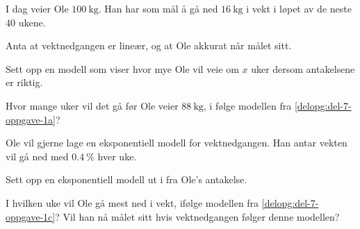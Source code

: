 I dag veier Ole $\SI{100}{\kg}$. Han har som mål å gå ned $\SI{16}{\kg}$ i vekt
i løpet av de neste $40$ ukene. \bigskip

Anta at vektnedgangen er lineær, og at Ole akkurat når målet sitt.

\begin{oppgaver}
   Sett opp en modell som viser hvor mye Ole vil veie om $x$ uker
  dersom antakelsene er riktig.
  \label{delopg:del-7-oppgave-1a}
\end{oppgaver}

\begin{oppgaver}
   Hvor mange uker vil det gå før Ole veier $\SI{88}{\kg}$, i følge
  modellen fra \cref{delopg:del-7-oppgave-1a}?
\end{oppgaver}

Ole vil gjerne lage en eksponentiell modell for vektnedgangen. Han antar vekten
vil gå ned med $\SI{0.4}{\percent}$ hver uke.

\begin{oppgaver}
   Sett opp en eksponentiell modell ut i fra Ole's antakelse.
  \label{delopg:del-7-oppgave-1c}
\end{oppgaver}

\begin{oppgaver}
   I hvilken uke vil Ole gå mest ned i vekt, ifølge modellen fra
  \cref{delopg:del-7-oppgave-1c}?
  Vil han nå målet sitt hvis vektnedgangen følger denne modellen?
\end{oppgaver}


\Oppgave[4]

\begin{figure}[H]
  \centering
  \begin{subfigure}[b]{0.32\textwidth}
    \centering
    \caption{}
    \label{fig:del-1-oppgave-8-a}
  \end{subfigure}\hfill%
  \begin{subfigure}[b]{0.32\textwidth}
    \centering
    \caption{}
    \label{fig:del-1-oppgave-8-b}
  \end{subfigure}\hfill%
  \begin{subfigure}[b]{0.32\textwidth}
    \centering
    \vspace{-0.45cm}
    \caption{}
    \label{fig:del-1-oppgave-8-c}
  \end{subfigure}
  \caption{}\label{fig:del-1-oppgave-8}
\end{figure}

